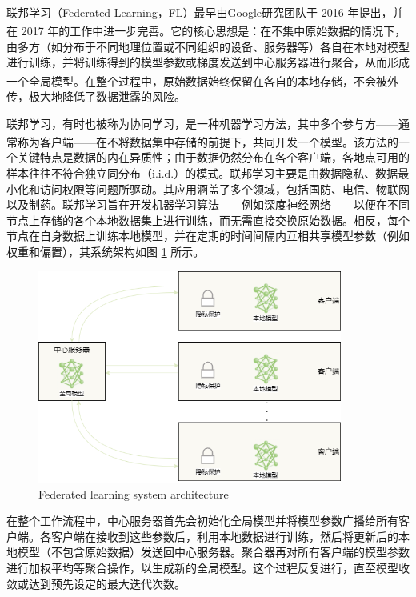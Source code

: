 联邦学习（Federated Learning，FL）最早由Google研究团队于 2016 年提出\textsuperscript{\cite{konevcny2016federated}}，并在 2017 年的工作中进一步完善\textsuperscript{\cite{mcmahan2017communication}}。它的核心思想是：在不集中原始数据的情况下，由多方（如分布于不同地理位置或不同组织的设备、服务器等）各自在本地对模型进行训练，并将训练得到的模型参数或梯度发送到中心服务器进行聚合，从而形成一个全局模型\textsuperscript{\cite{li2020federated}}。在整个过程中，原始数据始终保留在各自的本地存储，不会被外传，极大地降低了数据泄露的风险。

联邦学习，有时也被称为协同学习，是一种机器学习方法，其中多个参与方——通常称为客户端——在不将数据集中存储的前提下，共同开发一个模型\textsuperscript{\cite{kairouz2021advances}}。该方法的一个关键特点是数据的内在异质性；由于数据仍然分布在各个客户端，各地点可用的样本往往不符合独立同分布（i.i.d.）的模式。联邦学习主要是由数据隐私、数据最小化和访问权限等问题所驱动。其应用涵盖了多个领域，包括国防、电信、物联网以及制药。联邦学习旨在开发机器学习算法——例如深度神经网络——以便在不同节点上存储的各个本地数据集上进行训练，而无需直接交换原始数据。相反，每个节点在自身数据上训练本地模型，并在定期的时间间隔内互相共享模型参数（例如权重和偏置），其系统架构如图 \ref{FedArch} 所示。
\vspace{-0.1cm}
\begin{figure}[h]
	\centering
	\includegraphics[width=10cm]{chapters/imgs/FedArch3} %
	{\wuhao Federated learning system architecture}
	\label{FedArch}
\end{figure}
\vspace{-0.35cm}
在整个工作流程中，中心服务器首先会初始化全局模型并将模型参数广播给所有客户端。各客户端在接收到这些参数后，利用本地数据进行训练，然后将更新后的本地模型（不包含原始数据）发送回中心服务器。聚合器再对所有客户端的模型参数进行加权平均等聚合操作，以生成新的全局模型。这个过程反复进行，直至模型收敛或达到预先设定的最大迭代次数。

